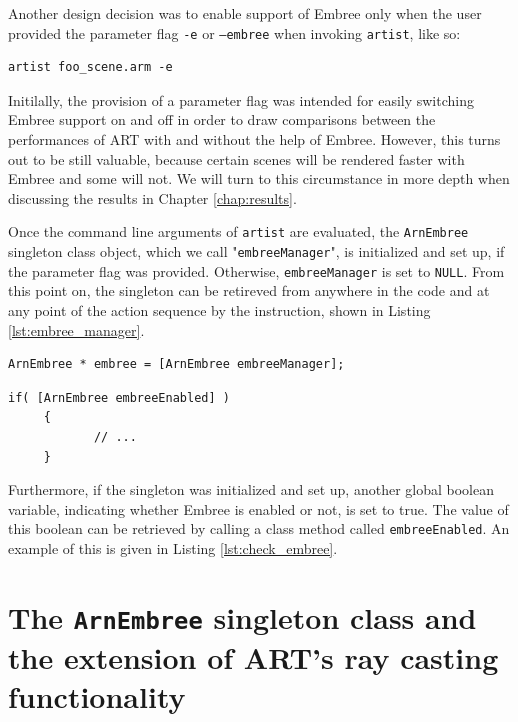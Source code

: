 Another design decision was to enable support of Embree only when the user provided the parameter flag \texttt{-e} or \texttt{--embree} when invoking \texttt{artist}, like so:

\begin{Verbatim}
artist foo_scene.arm -e
\end{Verbatim}

Initilally, the provision of a parameter flag was intended for easily switching Embree support on and off in order to draw comparisons between the performances of ART with and without the help of Embree. However, this turns out to be still valuable, because certain scenes will be rendered faster with Embree and some will not. We will turn to this circumstance in more depth when discussing the results in Chapter \ref{chap:results}. 

Once the command line arguments of \texttt{artist} are evaluated, the \texttt{ArnEmbree} singleton class object, which we call "\texttt{embreeManager}", is initialized and set up, if the parameter flag was provided. Otherwise, \texttt{embreeManager} is set to \texttt{NULL}. From this point on, the  singleton can be retireved from anywhere in the code and at any point of the action sequence by the instruction, shown in Listing \ref{lst:embree_manager}.

\begin{listing} 
	\begin{lstlisting}[caption={Retrieving the \texttt{ArnEmbree} singleton.}, label={lst:embree_manager}]
	ArnEmbree * embree = [ArnEmbree embreeManager];
	\end{lstlisting}
\end{listing}


\begin{listing}
	\begin{lstlisting}[caption={Verifying if the \texttt{ArnEmbree} singleton was initialized.}, label={lst:check_embree}]
	 if( [ArnEmbree embreeEnabled] ) 
	 {
	 		// ...
	 }
	\end{lstlisting}
\end{listing}

Furthermore, if the singleton was initialized and set up, another global boolean variable, indicating whether Embree is enabled or not, is set to true. The value of this boolean can be retrieved by calling a class method called \texttt{embreeEnabled}. An example of this is given in Listing \ref{lst:check_embree}.

\section{The \texttt{ArnEmbree} singleton class and the extension of ART's ray casting functionality}

